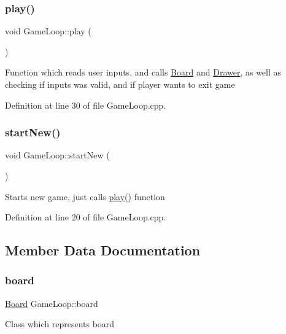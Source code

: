 \subsubsection{\texorpdfstring{play()}{play()}}
{\footnotesize\ttfamily void Game\+Loop\+::play (\begin{DoxyParamCaption}{ }\end{DoxyParamCaption})\hspace{0.3cm}{\ttfamily [private]}}

Function which reads user inputs, and calls \hyperlink{classBoard}{Board} and \hyperlink{classDrawer}{Drawer}, as well as checking if inputs was valid, and if player wants to exit game 

Definition at line 30 of file Game\+Loop.\+cpp.

\mbox{\label{classGameLoop_a12718de4b3e9535288cc77c8d5f27979}} 
\subsubsection{\texorpdfstring{start\+New()}{startNew()}}
{\footnotesize\ttfamily void Game\+Loop\+::start\+New (\begin{DoxyParamCaption}{ }\end{DoxyParamCaption})}

Starts new game, just calls \hyperlink{classGameLoop_a7e143e66d9a047a15d20c20da85f23d0}{play()} function 

Definition at line 20 of file Game\+Loop.\+cpp.



\subsection{Member Data Documentation}
\mbox{\label{classGameLoop_a73ffb8954f2f2fd298e2bfe22be73ce6}} 
\subsubsection{\texorpdfstring{board}{board}}
{\footnotesize\ttfamily \hyperlink{classBoard}{Board} Game\+Loop\+::board\hspace{0.3cm}{\ttfamily [private]}}

Class which represents board 

